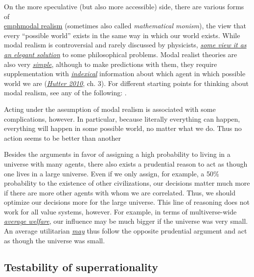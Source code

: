 On the more speculative (but also more accessible) side, there are
various forms of
\href{https://en.wikipedia.org/wiki/Modal_realism}{\\emph{modal
realism}} (sometimes also called \emph{mathematical monism}), the view
that every ``possible world'' exists in the same way in which our world
exists. While modal realism is controversial and rarely discussed by
physicists,
\href{http://reducing-suffering.org/why-does-physics-exist/\#Maybe_theres_no_such_thing_as_existence}{\emph{some
view it as an elegant solution}} to some philosophical problems. Modal
realist theories are also very
\href{http://lesswrong.com/lw/jp/occams_razor/}{\emph{simple}}, although
to make predictions with them, they require supplementation with
\href{https://en.wikipedia.org/wiki/Indexicality\#Extensions}{\emph{indexical}}
information about which agent in which possible world we are
(\href{https://arxiv.org/abs/0912.5434}{\emph{Hutter 2010}}, ch. 3). For
different starting points for thinking about modal realism, see any of
the following:
\cite{Lewis1986-rk,Tegmark1998-mf,Tegmark2008-sq,Tegmark2014-mw,Schmidhuber1997-vd}.

Acting under the assumption of modal realism is associated with some
complications, however. In particular, because literally everything can
happen, everything will happen in some possible world, no matter what we
do. Thus no action seems to be better than another~\parencite{Oesterheld201X-2}

Besides the arguments in favor of assigning a high probability to living
in a universe with many agents, there also exists a prudential reason to
act as though one lives in a large universe. Even if we only assign, for
example, a 50\% probability to the existence of other civilizations, our
decisions matter much more if there are more other agents with whom we
are correlated. Thus, we should optimize our decisions more for the
large universe. This line of reasoning does not work for all value
systems, however. For example, in terms of multiverse-wide
\href{https://en.wikipedia.org/wiki/Average_and_total_utilitarianism}{\emph{average
welfare}}, our influence may be much bigger if the universe was very
small. An average utilitarian
\href{https://casparoesterheld.com/2017/03/15/the-average-utilitarians-solipsism-wager/}{\emph{may}}
thus follow the opposite prudential argument and act as though the
universe was small.

\subsection{Testability of
superrationality}\label{testability-of-superrationality}

